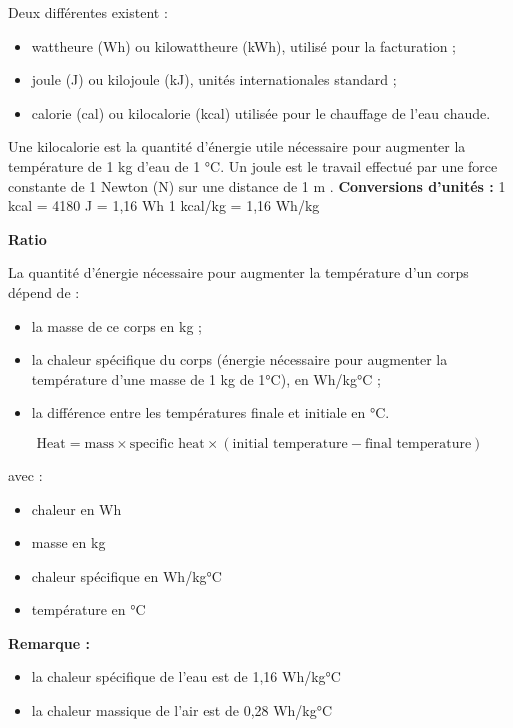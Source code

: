 Deux différentes existent :
\begin{itemize}
    \item wattheure (Wh) ou kilowattheure (kWh), utilisé pour la facturation ;
    \item joule (J) ou kilojoule (kJ), unités internationales standard ;
    \item calorie (cal) ou kilocalorie (kcal) utilisée pour le chauffage de l'eau chaude.
\end{itemize}
\vspace{0.3cm}
Une kilocalorie est la quantité d'énergie utile nécessaire pour augmenter la température de 1 kg d'eau de 1 °C.
Un joule est le travail effectué par une force constante de 1 Newton (N) sur une distance de 1 m .
\vspace{0.3cm}
\textbf{Conversions d'unités :}
1 kcal = 4180 J = 1,16 Wh
1 kcal/kg = 1,16 Wh/kg

\vspace{0.3cm}
\textbf{Ratio}
\vspace{0.3cm}

La quantité d'énergie nécessaire pour augmenter la température d'un corps dépend de :
\begin{itemize}
    \item la masse de ce corps en kg ;
    \item la chaleur spécifique du corps (énergie nécessaire pour augmenter la température d'une masse de 1 kg de 1°C), en Wh/kg°C ;
    \item la différence entre les températures finale et initiale en °C.
\end{itemize}

\begin{equation}
    \text{Heat} = \text{mass} \times \text{specific heat} \times (\text{initial temperature} - \text{final temperature})
\end{equation}

avec :
\begin{itemize}
    \item chaleur en Wh
    \item masse en kg
    \item chaleur spécifique en Wh/kg°C
    \item température en °C
\end{itemize}

\textbf{Remarque :}
\begin{itemize}
    \item la chaleur spécifique de l'eau est de 1,16 Wh/kg°C
    \item la chaleur massique de l'air est de 0,28 Wh/kg°C
\end{itemize}

